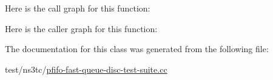 Here is the call graph for this function\+:




Here is the caller graph for this function\+:




The documentation for this class was generated from the following file\+:\begin{DoxyCompactItemize}
\item 
test/ns3tc/\hyperlink{pfifo-fast-queue-disc-test-suite_8cc}{pfifo-\/fast-\/queue-\/disc-\/test-\/suite.\+cc}\end{DoxyCompactItemize}
